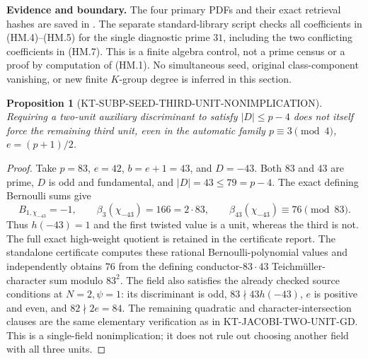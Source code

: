 \documentclass[11pt,a4paper]{article}
\newtheorem{proposition}[theorem]{Proposition}
\theoremstyle{definition}
\renewcommand{\paragraph}[1]{\par\smallskip\noindent\textbf{#1}\quad\ignorespaces}
\begin{document}
\paragraph{Evidence and boundary.}
The four primary PDFs and their exact retrieval hashes are saved in
.
The separate standard-library script
 checks all coefficients
in (HM.4)--(HM.5) for the single diagnostic prime $31$, including the
two conflicting coefficients in (HM.7).  This is a finite algebra
control, not a prime census or a proof by computation of (HM.1).
No simultaneous seed, original class-component vanishing, or new
finite $K$-group degree is inferred in this section.



\begin{proposition}[KT-SUBP-SEED-THIRD-UNIT-NONIMPLICATION]
Requiring a two-unit auxiliary discriminant to satisfy $|D|\leq p-4$
does not itself force the remaining third unit, even in the automatic
family $p\equiv3\pmod4$, $e=(p+1)/2$.
\end{proposition}
\begin{proof}
Take $p=83$, $e=42$, $b=e+1=43$, and $D=-43$.  Both $83$ and $43$
are prime, $D$ is odd and fundamental, and $|D|=43\leq79=p-4$.
The exact defining Bernoulli sums give
\[
 B_{1,\chi_{-43}}=-1,\qquad
 \beta_3(\chi_{-43})=166=2\cdot83,
 \qquad \beta_{43}(\chi_{-43})\equiv76\pmod{83}.
\]
Thus $h(-43)=1$ and the first twisted value is a unit, whereas the
third is not.  The full exact high-weight quotient is retained in the
certificate report.
The standalone certificate
 computes these rational
Bernoulli-polynomial values and independently obtains $76$ from the
defining conductor-$83\cdot43$ Teichm\"uller-character sum modulo $83^2$.
The field also satisfies the already checked source conditions at
$N=2,\psi=1$: its discriminant is odd, $83\nmid43h(-43)$, $e$ is
positive and even, and $82\nmid2e=84$.  The remaining quadratic and
character-intersection clauses are the same elementary verification
as in KT-JACOBI-TWO-UNIT-GD.  This is a single-field nonimplication;
it does not rule out choosing another field with all three units.
\end{proof}

\end{document}
